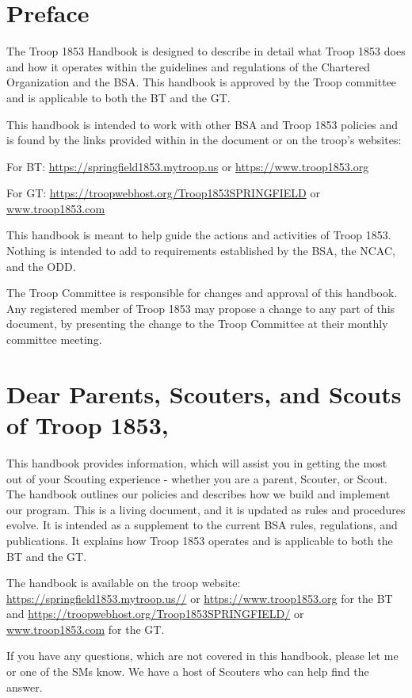\documentclass{ltxguide}
\begin{document}
\section*{Preface}
The Troop 1853 Handbook is designed to describe in detail what Troop 1853 does and how it operates within the guidelines and regulations of the Chartered Organization and the \ac{BSA}. This handbook is approved by the Troop committee and is applicable to both the \ac{BT} and the \ac{GT}.

This handbook is intended to work with other \ac{BSA} and Troop 1853 policies and is found by the links provided within in the document or on the troop's websites: 

For \ac{BT}: \url{https://springfield1853.mytroop.us} or \url{https://www.troop1853.org}

For \ac{GT}: \url{https://troopwebhost.org/Troop1853SPRINGFIELD} or \url{www.troop1853.com}

This handbook is meant to help guide the actions and activities of Troop 1853. Nothing is intended to add to requirements established by the \ac{BSA}, the \ac{NCAC}, and the \ac{ODD}.

The Troop Committee is responsible for changes and approval of this handbook. Any registered member of Troop 1853 may propose a change to any part of this document, by presenting the change to the Troop Committee at their monthly committee meeting.

\newpage
\section*{Dear Parents, Scouters, and Scouts of Troop 1853,}

This handbook provides information, which will assist you in getting the most out of your Scouting experience - whether you are a parent, Scouter, or Scout. The handbook outlines our policies and describes how we build and implement our program. This is a living document, and it is updated as rules and procedures evolve. It is intended as a supplement to the current \ac{BSA} rules, regulations, and publications. It explains how Troop 1853 operates and is applicable to both the \ac{BT} and the \ac{GT}.
 
The handbook is available on the troop website:
\url{https://springfield1853.mytroop.us//} or \url{https://www.troop1853.org} for the \ac{BT} and \url{https://troopwebhost.org/Troop1853SPRINGFIELD/} or \url{www.troop1853.com} for the \ac{GT}. 

If you have any questions, which are not covered in this handbook, please let me or one of the \acp{SM} know. We have a host of Scouters who can help find the answer.
\end{document}
